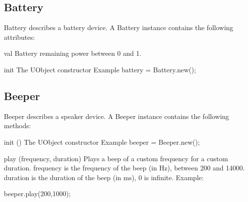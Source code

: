 \subsection{Battery}
Battery describes a battery device. A Battery instance contains the following
attributes:
\begin{urbiscriptapi}

\item[val]
Battery remaining power between 0 and 1.

\item[init]
The UObject constructor Example battery = Battery.new();
\end{urbiscriptapi}

\subsection{Beeper}
Beeper describes a speaker device. A Beeper instance contains the following
methods:

\begin{urbiscriptapi}

\item[init]()
The UObject constructor Example beeper = Beeper.new();
\item[play](frequency, duration)
Plays a beep of a custom frequency for a custom duration.
frequency is the frequency of the beep (in Hz), between 200 and 14000.
duration is the duration of the beep (in ms), 0 is infinite.
Example:
\begin{urbiunchecked}
  beeper.play(200,1000);
\end{urbiunchecked}


\end{urbiscriptapi}

